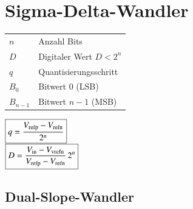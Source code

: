 \section{Sigma-Delta-Wandler}

\begin{minipage}{0.45\linewidth}
    \begin{tabular}{ll}
        $n$ & Anzahl Bits \\
        $D$ & Digitaler Wert \quad $D < 2^n$ \\
        $q$ & Quantisierungsschritt \\
        $B_0$ & Bitwert 0 (LSB) \\
        $B_{n-1}$ & Bitwert $n-1$ (MSB)
    \end{tabular}
\end{minipage}
\hfill
\begin{minipage}{0.42\linewidth}
    $ \boxed{ q = \frac{V_{\rm refp} - V_{\rm refn}}{2^n} } $ \\
    $ \boxed{ D = \frac{V_{\rm in} - V_{\rm vrefn}}{V_{\rm refp} - V_{\rm refn}} \, 2^n }  $
\end{minipage}


\subsection{Dual-Slope-Wandler}

